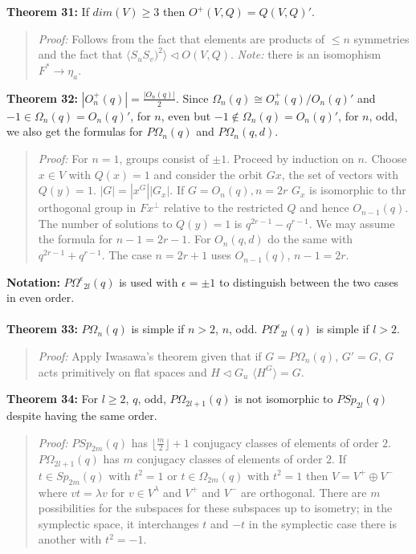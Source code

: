 {\bf Theorem 31:}  If $dim(V) \ge 3$ then $O^+(V,Q)= Q(V,Q)'$.
\begin{quote}
\emph{Proof:}  
Follows from the fact that elements are products of $\le n$ symmetries and the fact that
$ \langle S_u S_v)^2 \rangle \lhd O(V,Q)$.  \emph{Note:} there is an 
isomophism $F^* \rightarrow \eta_a$.
\end{quote}
{\bf Theorem 32:} 
$|O^+_n(q)|= {\frac {|O_n(q)|} {2}}$.  Since $\Omega_n(q) \cong O^+_n(q)/O_n(q)'$ and
$-1 \in \Omega_n(q)= O_n(q)'$, for $n$, even but
$-1 \notin \Omega_n(q)= O_n(q)'$, for $n$, odd, we also get the formulas for
$P \Omega_n(q)$ and $P \Omega_n(q, d)$.
\begin{quote}
\emph{Proof:}  
For $n=1$, groups consist of $\pm 1$.  Proceed by induction on $n$.  Choose $x \in V$ with
$Q(x)=1$ and consider the orbit $Gx$, the set of vectors with $Q(y)=1$.
$|G|= |x^G| |G_x|$. 
If $G= O_n(q), n=2r$  $G_x$ is  isomorphic to thr orthogonal group in $Fx^{\perp}$ relative to the restricted
$Q$ and hence $O_{n-1}(q)$.  The number of solutions to $Q(y)=1$ is $q^{2r-1}-q^{r-1}$.  We may assume the formula
for $n-1=2r-1$.  For $O_n(q,d)$ do the same with $q^{2r-1}+q^{r-1}$.  The case $n=2r+1$ uses $O_{n-1}(q)$, $n-1=2r$.
\end{quote}
{\bf Notation:}
${P\Omega^{\epsilon}}_{2l}(q)$ is used with $\epsilon= \pm 1$ to distinguish between the 
two cases in even order.
\\
\\
{\bf Theorem 33:}
$P\Omega_n(q)$ is simple if $n>2$, $n$, odd. 
${P\Omega^{\epsilon}}_{2l}(q)$ is simple if $l>2$.
\begin{quote}
\emph{Proof:}  
Apply Iwasawa's theorem given that if
$G= P\Omega_n(q)$, $G'=G$,
$G$ acts primitively on flat spaces and $H \lhd G_u$ 
$ \langle H^G \rangle = G$.
\end{quote}
{\bf Theorem 34:}
For $l \ge 2$, $q$, odd,
$P\Omega_{2l+1}(q)$ is not isomorphic to $PSp_{2l}(q)$ despite having the same order.
\begin{quote}
\emph{Proof:}  
$PSp_{2m}(q)$ has $\lfloor {\frac m 2} \rfloor + 1$ conjugacy classes of elements of
order $2$.
$P \Omega_{2l+1}(q)$ has $m$ conjugacy classes of elements of order $2$.
If $t \in Sp_{2m}(q)$ with $t^2=1$
or $t \in \Omega_{2m}(q)$ with $t^2=1$ then $V= V^+ \oplus V^-$ where $vt= \lambda v$
for $v \in V^{\lambda}$ and $V^+$ and $V^-$ are orthogonal.  There are $m$ possibilities
for the subspaces for these subspaces up to isometry; in the symplectic space, it interchanges
$t$ and $-t$ in the symplectic case there is another with $t^2= -1$.
\end{quote}
